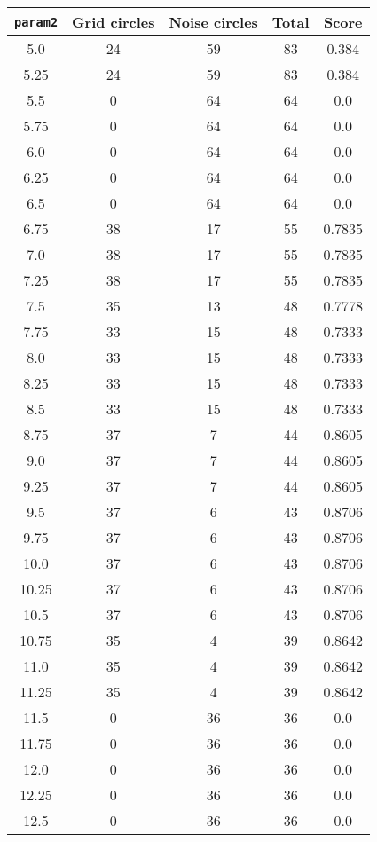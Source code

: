 \documentclass[letterpaper, 12pt]{article}
\begin{document}
\begin{longtable}{|c|c|c|c|c|}
\hline
\textbf{\texttt{param2}} & \textbf{Grid circles} & \textbf{Noise circles} & \textbf{Total} & \textbf{Score} \\
\hline
5.0 & 24 & 59 & 83 & 0.384 \\
\hline
5.25 & 24 & 59 & 83 & 0.384 \\
\hline
5.5 & 0 & 64 & 64 & 0.0 \\
\hline
5.75 & 0 & 64 & 64 & 0.0 \\
\hline
6.0 & 0 & 64 & 64 & 0.0 \\
\hline
6.25 & 0 & 64 & 64 & 0.0 \\
\hline
6.5 & 0 & 64 & 64 & 0.0 \\
\hline
6.75 & 38 & 17 & 55 & 0.7835 \\
\hline
7.0 & 38 & 17 & 55 & 0.7835 \\
\hline
7.25 & 38 & 17 & 55 & 0.7835 \\
\hline
7.5 & 35 & 13 & 48 & 0.7778 \\
\hline
7.75 & 33 & 15 & 48 & 0.7333 \\
\hline
8.0 & 33 & 15 & 48 & 0.7333 \\
\hline
8.25 & 33 & 15 & 48 & 0.7333 \\
\hline
8.5 & 33 & 15 & 48 & 0.7333 \\
\hline
8.75 & 37 & 7 & 44 & 0.8605 \\
\hline
9.0 & 37 & 7 & 44 & 0.8605 \\
\hline
9.25 & 37 & 7 & 44 & 0.8605 \\
\hline
9.5 & 37 & 6 & 43 & 0.8706 \\
\hline
9.75 & 37 & 6 & 43 & 0.8706 \\
\hline
10.0 & 37 & 6 & 43 & 0.8706 \\
\hline
10.25 & 37 & 6 & 43 & 0.8706 \\
\hline
10.5 & 37 & 6 & 43 & 0.8706 \\
\hline
10.75 & 35 & 4 & 39 & 0.8642 \\
\hline
11.0 & 35 & 4 & 39 & 0.8642 \\
\hline
11.25 & 35 & 4 & 39 & 0.8642 \\
\hline
11.5 & 0 & 36 & 36 & 0.0 \\
\hline
11.75 & 0 & 36 & 36 & 0.0 \\
\hline
12.0 & 0 & 36 & 36 & 0.0 \\
\hline
12.25 & 0 & 36 & 36 & 0.0 \\
\hline
12.5 & 0 & 36 & 36 & 0.0 \\

\end{longtable}
\end{document}
